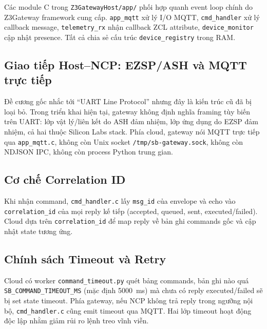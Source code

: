 Các module C trong \texttt{Z3GatewayHost/app/} phối hợp quanh event
loop chính do Z3Gateway framework cung cấp. \texttt{app\_mqtt} xử lý
I/O MQTT, \texttt{cmd\_handler} xử lý callback message,
\texttt{telemetry\_rx} nhận callback ZCL attribute,
\texttt{device\_monitor} cập nhật presence. Tất cả chia sẻ cấu trúc
\texttt{device\_registry} trong RAM.

\subsection{Giao tiếp Host--NCP: EZSP/ASH và MQTT trực tiếp}
\label{sec:ch3-uart-impl}

Đề cương gốc nhắc tới ``UART Line Protocol'' nhưng đây là kiến trúc
cũ đã bị loại bỏ. Trong triển khai hiện tại, gateway không định
nghĩa framing tùy biến trên UART: lớp vật lý/liên kết do ASH đảm
nhiệm, lớp ứng dụng do EZSP đảm nhiệm, cả hai thuộc Silicon Labs
stack. Phía cloud, gateway nói MQTT trực tiếp qua
\texttt{app\_mqtt.c}, không còn Unix socket
\texttt{/tmp/sb-gateway.sock}, không còn NDJSON IPC, không còn
process Python trung gian.

\subsection{Cơ chế Correlation ID}
\label{sec:ch3-correlation}

Khi nhận command, \texttt{cmd\_handler.c} lấy \texttt{msg\_id} của
envelope và echo vào \texttt{correlation\_id} của mọi reply kế tiếp
(accepted, queued, sent, executed/failed). Cloud dựa trên
\texttt{correlation\_id} để map reply về bản ghi commands gốc và cập
nhật state tương ứng.

\subsection{Chính sách Timeout và Retry}
\label{sec:ch3-timeout-retry}

Cloud có worker \texttt{command\_timeout.py} quét bảng commands, bản
ghi nào quá \texttt{SB\_COMMAND\_TIMEOUT\_MS} (mặc định 5000~ms) mà
chưa có reply executed/failed sẽ bị set state timeout. Phía gateway,
nếu NCP không trả reply trong ngưỡng nội bộ, \texttt{cmd\_handler.c}
cũng emit timeout qua MQTT. Hai lớp timeout hoạt động độc lập nhằm
giảm rủi ro lệnh treo vĩnh viễn.

